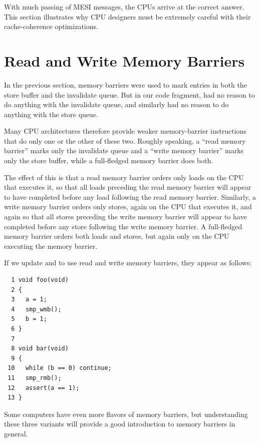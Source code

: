 With much passing of MESI messages, the CPUs arrive at the correct answer.
This section illustrates why CPU designers must be extremely careful
with their cache-coherence optimizations.

\section{Read and Write Memory Barriers}
\label{sec:app:whymb:Read and Write Memory Barriers}

In the previous section, memory barriers were used to mark entries in
both the store buffer and the invalidate queue.
But in our code fragment,  had no reason to do anything
with the invalidate queue, and  similarly had no reason
to do anything with the store queue.

Many CPU architectures therefore provide weaker memory-barrier
instructions that do only one or the other of these two.
Roughly speaking, a ``read memory barrier'' marks only the invalidate
queue and a ``write memory barrier'' marks only the store buffer,
while a full-fledged memory barrier does both.

The effect of this is that a read memory barrier orders only loads
on the CPU that executes it, so that all loads preceding the read memory
barrier will appear to have completed before any load following the
read memory barrier.
Similarly, a write memory barrier orders
only stores, again on the CPU that executes it, and again so that
all stores preceding the write memory barrier will appear to have
completed before any store following the write memory barrier.
A full-fledged memory barrier orders both loads and stores, but again
only on the CPU executing the memory barrier.

If we update  and  to use read and write memory
barriers, they appear as follows:

\vspace{5pt}
\begin{minipage}[t]{\columnwidth}
\small
\begin{verbatim}
  1 void foo(void)
  2 {
  3   a = 1;
  4   smp_wmb();
  5   b = 1;
  6 }
  7
  8 void bar(void)
  9 {
 10   while (b == 0) continue;
 11   smp_rmb();
 12   assert(a == 1);
 13 }
\end{verbatim}
\end{minipage}
\vspace{5pt}

Some computers have even more flavors of memory barriers, but
understanding these three variants will provide a good introduction
to memory barriers in general.

